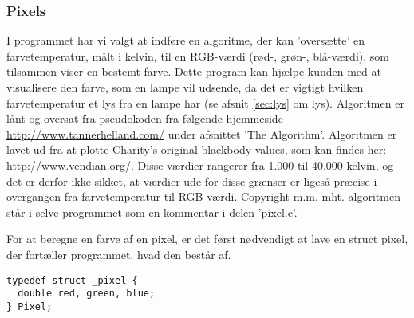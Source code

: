\subsubsection{Pixels}
I programmet har vi valgt at indføre en algoritme, der kan ’oversætte’ en farvetemperatur, målt i kelvin, til en RGB-værdi (rød-, grøn-, blå-værdi), som tilsammen viser en bestemt farve. Dette program kan hjælpe kunden med at visualisere den farve, som en lampe vil udsende, da det er vigtigt hvilken farvetemperatur et lys fra en lampe har (se afsnit \ref{sec:lys} om lys). Algoritmen er lånt og oversat fra pseudokoden fra følgende hjemmeside \href{http://www.tannerhelland.com/4435/convert-temperature-rgb-algorithm-code/}{http://www.tannerhelland.com/} under afsnittet 'The Algorithm'. Algoritmen er lavet ud fra at plotte Charity’s original blackbody values, som kan findes her: \href{http://www.vendian.org/mncharity/dir3/blackbody/UnstableURLs/bbr_color.html}{http://www.vendian.org/}. Disse værdier rangerer fra 1.000 til 40.000 kelvin, og det er derfor ikke sikket, at værdier ude for disse grænser er ligeså præcise i overgangen fra farvetemperatur til RGB-værdi. Copyright m.m. mht. algoritmen står i selve programmet som en kommentar i delen ’pixel.c’.


For at beregne en farve af en pixel, er det først nødvendigt at lave en struct pixel, der fortæller programmet, hvad den består af. 
\begin{lstlisting}[style=Cstyle, caption=vector dot]
typedef struct _pixel {
  double red, green, blue;
} Pixel;
\end{lstlisting}


